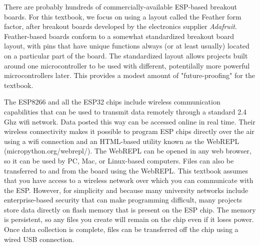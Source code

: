 There are probably hundreds of commercially-available ESP-based breakout boards. 
For this textbook, we focus on using a layout called the Feather form factor, after breakout boards developed by the electronics supplier \emph{Adafruit}.  
Feather-based boards conform to a somewhat standardized breakout board layout, with pins that have unique functions always (or at least usually) located on a particular part of the board.
The standardized layout allows projects built around one microcontroller to be used with different, potentilally more powerful microcontrollers later.
This provides a modest amount of "future-proofing" for the textbook.

The ESP8266 and all the ESP32 chips include wireless communication capabilities that can be used to transmit data remotely through a standard 2.4 Ghz wifi network.
Data posted this way can be accessed online in real time.
Their wireless connectivity makes it possible to program ESP chips directly over the air using a wifi connection and an HTML-based utility known as the WebREPL (micropython.org/webrepl/).  
The WebREPL can be opened in any web browser, so it can be used by PC, Mac, or Linux-based computers.
Files can also be transferred to and from the board using the WebREPL.
This textbook assumes that you have access to a wireless network over which you can communicate with the ESP.
However, for simplicity and because many university networks include enterprise-based security that can make programming difficult, many projects store data directly on flash memory that is present on the ESP chip.
The memory is persistent, so any files you create will remain on the chip even if it loses power. 
Once data collection is complete, files can be transferred off the chip using a wired USB connection. 

